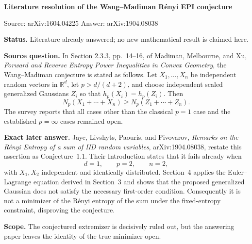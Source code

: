 \documentclass[11pt]{article}
\begin{document}
\begin{center}
{\Large\bfseries Literature resolution of the Wang--Madiman Rényi EPI conjecture}\par
\vspace{0.4em}
{\small Source: arXiv:1604.04225 \qquad Answer: arXiv:1904.08038}
\end{center}

\textbf{Status.} Literature already answered; no new mathematical result is
claimed here.

\textbf{Source question.} In Section 2.3.3, pp.~14--16, of Madiman,
Melbourne, and Xu, \emph{Forward and Reverse Entropy Power Inequalities in
Convex Geometry}, the Wang--Madiman conjecture is stated as follows.  Let
$X_1,\ldots,X_n$ be independent random vectors in $\mathbb R^d$, let
$p>d/(d+2)$, and choose independent scaled generalized Gaussians $Z_i$ so
that $h_p(X_i)=h_p(Z_i)$.  Then
\[
 N_p(X_1+\cdots+X_n)\geq N_p(Z_1+\cdots+Z_n).
\]
The survey reports that all cases other than the classical $p=1$ case and
the established $p=\infty$ cases remained open.

\textbf{Exact later answer.} Jaye, Livshyts, Paouris, and Pivovarov,
\emph{Remarks on the Rényi Entropy of a sum of IID random variables},
arXiv:1904.08038, restate this assertion as Conjecture~1.1.  Their
Introduction states that it fails already when
\[
 d=1,\qquad p=2,\qquad n=2,
\]
with $X_1,X_2$ independent and identically distributed.  Section~4 applies
the Euler--Lagrange equation derived in Section~3 and shows that the proposed
generalized Gaussian does not satisfy the necessary first-order condition.
Consequently it is not a minimizer of the Rényi entropy of the sum under the
fixed-entropy constraint, disproving the conjecture.

\textbf{Scope.} The conjectured extremizer is decisively ruled out, but the
answering paper leaves the identity of the true minimizer open.
\end{document}
